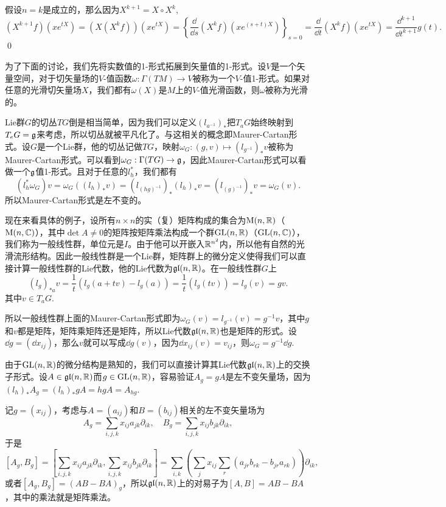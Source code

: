 假设$n=k$是成立的，那么因为$X^{k+1}=X\circ X^k$,
\[
	(X^{k+1}f)(x e^{tX})=(X(X^{k}f))(x e^{tX})=\left\{\frac{\dd}{\dd s}(X^kf)(x e^{(s+t)X})\right\}_{s=0}=\frac{\dd}{\dd t}(X^kf)(x e^{tX})=\frac{\dd^{k+1}}{\dd t^{k+1}}g(t).
\]\qed

\para 为了下面的讨论，我们先将实数值的1-形式拓展到矢量值的1-形式。设$V$是一个矢量空间，对于切矢量场的$V$-值函数$\omega:\Gamma(TM)\to V$被称为一个$V$-值1-形式。如果对任意的光滑切矢量场$X$，我们都有$\omega(X)$是$M$上的$V$-值光滑函数，则$\omega$被称为光滑的。

\para Lie群$G$的切丛$TG$倒是相当简单，因为我们可以定义$(l_{a^{-1}})_*$把$T_aG$始终映射到$T_eG={\mathfrak{g}}$来考虑，所以切丛就被平凡化了。与这相关的概念即Maurer-Cartan形式。设$G$是一个Lie群，他的切丛记做$TG$，映射$\omega_G:(g,v)\mapsto (l_{g^{-1}})_*v$被称为Maurer-Cartan形式。可以看到$\omega_G:\Gamma(TG)\to {\mathfrak{g}}$，因此Maurer-Cartan形式可以看做一个${\mathfrak{g}}$值1-形式。且对于任意的$l_h^*$，我们都有
\[
	(l_h^*\omega_G)v=\omega_G((l_h)_*v)=(l_{(hg)^{-1}})_*(l_h)_*v=(l_{(g)^{-1}})_*v=\omega_G(v).
\]
所以Maurer-Cartan形式是左不变的。

\para 现在来看具体的例子，设所有$n\times n$的实（复）矩阵构成的集合为$\mathrm{M}(n,\mathbb{R})$（$\mathrm{M}(n,\mathbb{C})$），其中$\det A\neq 0$的矩阵按矩阵乘法构成一个群$\mathrm{GL}(n,\mathbb{R})$（$\mathrm{GL}(n,\mathbb{C})$），我们称为一般线性群，单位元是$I$。由于他可以开嵌入$\mathbb{R}^{n^2}$内，所以他有自然的光滑流形结构。因此一般线性群是一个Lie群，矩阵群上的微分定义使得我们可以直接计算一般线性群的Lie代数，他的Lie代数为$\mathfrak{gl}(n,\mathbb{R})$。在一般线性群$G$上
\[
	(l_g)_{*a}v=\frac{1}{t}(l_g(a+tv)-l_g(a))
	=\frac{1}{t}(l_g(tv))=l_g(v)=gv.
\]
其中$v\in T_aG$.

所以一般线性群上面的Maurer-Cartan形式即为$\omega_G(v)=l_{g^{-1}}(v)=g^{-1}v$，其中$g$和$v$都是矩阵，矩阵乘矩阵还是矩阵，所以Lie代数$\mathfrak{gl}(n,\mathbb{R})$也是矩阵的形式。设$\dd g=(\dd x_{ij})$，那么$v$就可以写成$\dd g(v)$，因为$\dd x_{ij}(v)=v_{ij}$，则$\omega_G=g^{-1}\dd g$.

由于$\mathrm{GL}(n,\mathbb{R})$的微分结构是熟知的，我们可以直接计算其Lie代数$\mathfrak{gl}(n,\mathbb{R})$上的交换子形式。设$A\in\mathfrak{gl}(n,\mathbb{R})$而$g\in\mathrm{GL}(n,\mathbb{R})$，容易验证$A_g=gA$是左不变矢量场，因为$(l_h)_{*}A_g=(l_h)_{*}gA=hgA=A_{hg}$.

记$g=(x_{ij})$，考虑与$A=(a_{ij})$和$B=(b_{ij})$相关的左不变矢量场为
\[
A_g=\sum_{i,j,k}x_{ij}a_{jk}\partial_{ik},\quad B_g=\sum_{i,j,k}x_{ij}b_{jk}\partial_{ik},
\]
于是
\[
[A_g,B_g]=\left[\sum_{i,j,k}x_{ij}a_{jk}\partial_{ik},\sum_{i,j,k}x_{ij}b_{jk}\partial_{ik}\right]=\sum_{i,k}\left(\sum_{j}x_{ij}\sum_{r}(a_{jr}b_{rk}-b_{jr}a_{rk})\right)\partial_{ik},
\]
或者$[A_g,B_g]=(AB-BA)_g$，所以$\mathfrak{gl}(n,\mathbb{R})$上的对易子为$[A,B]=AB-BA$，其中的乘法就是矩阵乘法。

